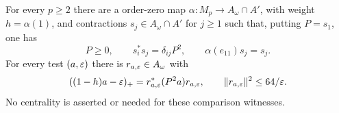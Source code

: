 \begin{proposition}\label{prop:slots}
For every $p\ge2$ there are a \cpc order-zero map
$\alpha:M_p\to A_\omega\cap A'$, with weight $h=\alpha(1)$,
and contractions $s_j\in A_\omega\cap A'$ for $j\ge1$ such that,
putting $P=s_1$, one has
\begin{equation}\label{cmp:slot-relations}
 P\ge0,\qquad s_i^*s_j=\delta_{ij}P^2,
 \qquad \alpha(e_{11})s_j=s_j.
\end{equation}
For every test $(a,\varepsilon)$ there is $r_{a,\varepsilon}\in A_\omega$ with
\begin{equation}\label{cmp:slot-comparison}
 ((1-h)a-\varepsilon)_+
       =r_{a,\varepsilon}^*(P^2a)r_{a,\varepsilon},
 \qquad \|r_{a,\varepsilon}\|^2\le64/\varepsilon.
\end{equation}
No centrality is asserted or needed for these comparison witnesses.
\end{proposition}


